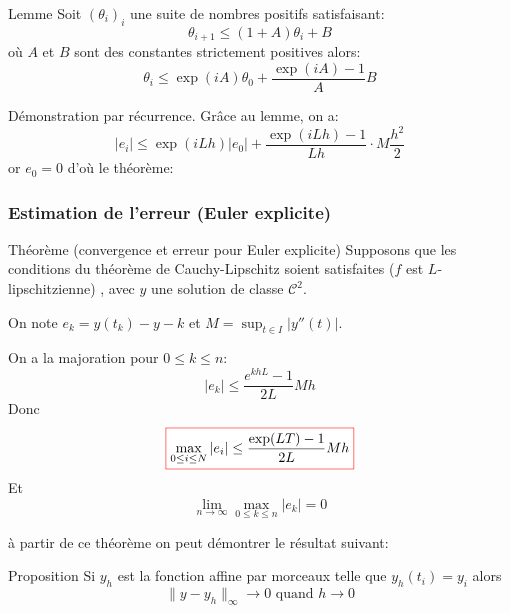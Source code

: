 \documentclass{beamer}
\newcommand{\myredbox}[1]{\fcolorbox{red}{white}{$\displaystyle#1$}}
\begin{document}
 \begin{frame}
 
 \begin{block}{Lemme}
 Soit $(\theta_i)_i$ une suite de nombres positifs satisfaisant:
\[\theta_{i+1}\leq (1+A)\theta_i +B\]
où $A$ et $B$ sont des constantes strictement positives alors:
\[\theta_i \leq \exp(i A)\theta_0 +\frac{\exp(i A)- 1}{A}B\]
 \end{block}

Démonstration par récurrence.
Grâce au lemme, on a:
\[|e_i| \leq \exp(i L h)|e_0| +\frac{\exp(i L h)- 1}{L h}\cdot M\frac{h^2}2\]
or $e_0=0$ d'où le théorème:
\end{frame}   
\begin{frame}
\frametitle{Estimation de l'erreur (Euler explicite)}
\begin{block}{Théorème (convergence et erreur pour Euler explicite)}
Supposons que les conditions du théorème de Cauchy-Lipschitz soient satisfaites ($f$ est $L$-lipschitzienne) , avec $y$ une solution de classe $\mathcal{C}^2$.

On note $e_k = y(t_k) - y-k$ et $M = \sup_{t\in I} |y''(t)|$.

On a la majoration pour $0\leq k \leq n$:
\[|e_k|\leq \frac{e^{khL}-1}{2L}M h\]
Donc
\[\myredbox{\max_{0\leq i\leq N}|e_i|\leq \frac{\exp(L T)- 1}{2L }Mh}\]
Et
\[\lim_{n\to\infty}\max_{0\leq k \leq n}|e_k|=0\]
\end{block}
 \end{frame}  
\begin{frame}
à partir de ce théorème on peut démontrer le résultat suivant:
\begin{block}{Proposition}
Si $y_h$ est la fonction affine par morceaux telle que $y_h(t_i)=y_i$ alors
\[\|y-y_h\|_{\infty}\longrightarrow 0\mbox{ quand }h\longrightarrow 0\]

\end{block}

\end{frame}   
    
\end{document}
